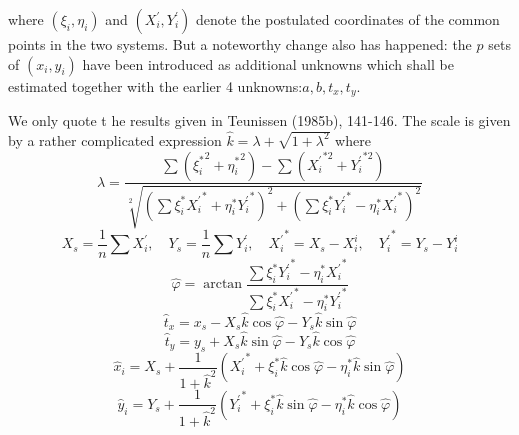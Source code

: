 where $(\xi_i, \eta_i)$ and $(X_{i}^{'},Y_{i}^{'})$ denote the postulated coordinates of the common points in the two systems. But a noteworthy change also has happened: the $p$ sets of $(x_i, y_i)$ have been introduced as additional unknowns which shall be estimated together with the earlier 4 unknowns:$a, b, t_x, t_y$.
\par
We only quote t
he results given in Teunissen (1985b), 141-146. The scale is given
by a rather complicated expression $\hat{k} = \lambda + \sqrt{1 + \lambda^2}$ where
\begin{equation*}
\lambda =  \frac{\sum({\xi_{i}^{\ast}}^2 + {\eta_{i}^{\ast}}^2) - \sum({X_{i}^{'}}^{\ast2} + {Y_{i}^{'}}^{\ast2})}
{\sqrt[2]{(\sum\xi_{i}^{\ast}{X_{i}^{'}}^{\ast} + \eta_{i}^{\ast}{Y_{i}^{'}}^{\ast})^{2} + (\sum\xi_{i}^{\ast}{Y_{i}^{'}}^{\ast} - \eta_{i}^{\ast}{X_{i}^{'}}^{\ast})^{2}}}
\end{equation*}
\begin{equation*}
X_s =  \frac{1}{n}\sum X_{i}^{'},\quad  Y_s = \frac{1}{n}\sum Y_{i}^{'},\quad {X_{i}^{'}}^{\ast} = X_s - X_{i}^{i},\quad  {Y_{i}^{'}}^{\ast} = Y_s - Y_{i}^{i}
\end{equation*}
\begin{equation}
\hat{\varphi} = \arctan{\frac{\sum \xi_{i}^{\ast}{Y_{i}^{'}}^{\ast} - \eta_{i}^{\ast}{X_{i}^{'}}^{\ast}}{\sum \xi_{i}^{\ast}{X_{i}^{'}}^{\ast} - \eta_{i}^{\ast}{Y_{i}^{'}}^{\ast}}}
\end{equation}
\begin{equation*}
\hat{t}_x = x_s - X_s\hat{k}\cos{\hat{\varphi}} - Y_s\hat{k}\sin{\hat{\varphi}}
\end{equation*}
\begin{equation*}
\hat{t}_y = y_s + X_s\hat{k}\sin{\hat{\varphi}} - Y_s\hat{k}\cos{\hat{\varphi}}
\end{equation*}
\begin{equation*}
\hat{x}_i = X_s + \frac{1}{1 + \hat{k}^2}({X_{i}^{'}}^\ast + \xi_{i}^{\ast}\hat{k}\cos\hat{\varphi} - \eta_{i}^{\ast}\hat{k}\sin\hat{\varphi})
\end{equation*}
\begin{equation*}
\hat{y}_i =
Y_s + \frac{1}{1 + \hat{k}^2}({Y_{i}^{'}}^\ast + \xi_{i}^{\ast}\hat{k}\sin\hat{\varphi} - \eta_{i}^{\ast}\hat{k}\cos\hat{\varphi})
\end{equation*}


